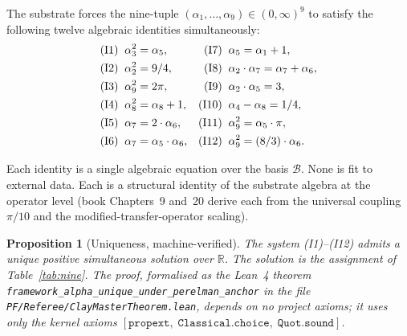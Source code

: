 \documentclass[11pt,a4paper]{amsart}
\theoremstyle{plain}
\newtheorem{proposition}[theorem]{Proposition}
\theoremstyle{definition}
\begin{document}
The substrate forces the nine-tuple $(\alpha_1, \ldots, \alpha_9) \in (0,\infty)^9$ to satisfy the following twelve algebraic identities simultaneously:
\begin{align*}
\textup{(I1)}\;\;& \alpha_3^2 = \alpha_5, &
\textup{(I7)}\;\;& \alpha_5 = \alpha_1 + 1,\\
\textup{(I2)}\;\;& \alpha_2^2 = 9/4, &
\textup{(I8)}\;\;& \alpha_2\cdot\alpha_7 = \alpha_7 + \alpha_6,\\
\textup{(I3)}\;\;& \alpha_9^2 = 2\pi, &
\textup{(I9)}\;\;& \alpha_2\cdot\alpha_5 = 3,\\
\textup{(I4)}\;\;& \alpha_8^2 = \alpha_8 + 1, &
\textup{(I10)}\;\;& \alpha_4 - \alpha_8 = 1/4,\\
\textup{(I5)}\;\;& \alpha_7 = 2\cdot\alpha_6, &
\textup{(I11)}\;\;& \alpha_9^2 = \alpha_5\cdot\pi,\\
\textup{(I6)}\;\;& \alpha_7 = \alpha_5\cdot\alpha_6, &
\textup{(I12)}\;\;& \alpha_9^2 = (8/3)\cdot\alpha_6.
\end{align*}

Each identity is a single algebraic equation over the basis $\mathcal{B}$. None is fit to external data. Each is a structural identity of the substrate algebra at the operator level (book Chapters~9 and~20 derive each from the universal coupling $\pi/10$ and the modified-transfer-operator scaling).

\begin{proposition}[Uniqueness, machine-verified]\label{prop:unique}
The system \textup{(I1)--(I12)} admits a unique positive simultaneous solution over $\mathbb{R}$. The solution is the assignment of Table~\ref{tab:nine}. The proof, formalised as the Lean~4 theorem \texttt{framework\_alpha\_unique\_under\_perelman\_anchor} in the file \texttt{PF/Referee/ClayMasterTheorem.lean}, depends on no project axioms; it uses only the kernel axioms $[\texttt{propext},\;\texttt{Classical.choice},\;\texttt{Quot.sound}]$.
\end{proposition}
\end{document}
